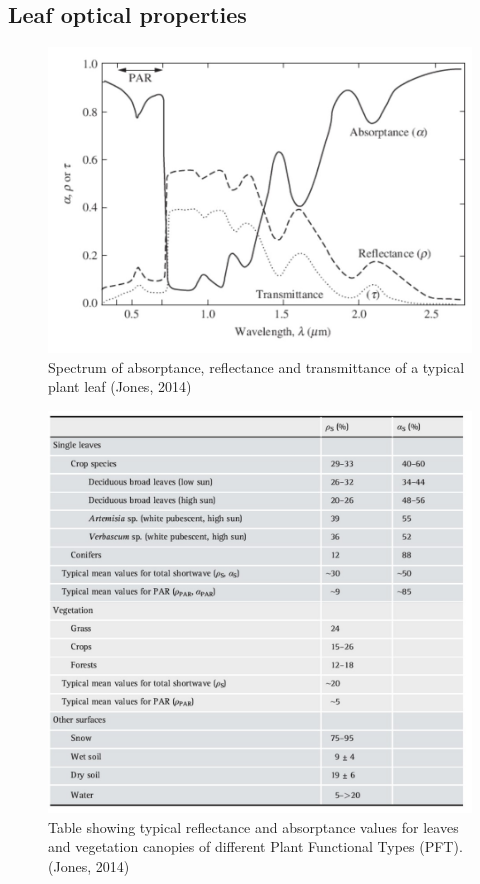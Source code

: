 \documentclass[
  oneside]{book}
\begin{document}
\hypertarget{leaf-optical-properties}{%
\subsection{Leaf optical properties}\label{leaf-optical-properties}}

\begin{figure}

{\centering \includegraphics[width=0.8\linewidth]{figures/chap3/f37_leaf_optical} 

}

\caption{Spectrum of absorptance, reflectance and transmittance of a typical plant leaf (Jones, 2014)}\label{fig:f37b}
\end{figure}

\begin{figure}

{\centering \includegraphics[width=0.8\linewidth]{figures/chap3/f38_table_optical} 

}

\caption{Table showing typical reflectance and absorptance values for leaves and vegetation canopies of different Plant Functional Types (PFT).(Jones, 2014)}\label{fig:f38}
\end{figure}
\end{document}
